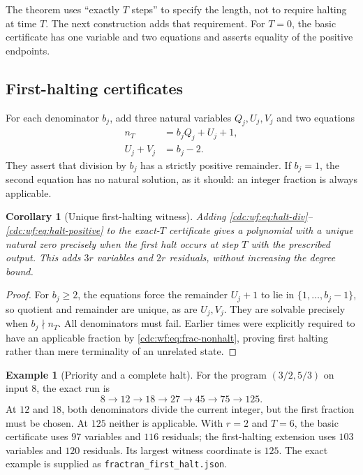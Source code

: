 \documentclass[11pt,a4paper]{article}
\newtheorem{corollary}[corollary]{Corollary}
\theoremstyle{definition}
\newtheorem{example}[example]{Example}
\theoremstyle{remark}
\begin{document}
The theorem uses ``exactly $T$ steps'' to specify the length, not to require halting at time $T$. The next construction adds that requirement. For $T=0$, the basic certificate has one variable and two equations and asserts equality of the positive endpoints.

\subsection{First-halting certificates}
For each denominator $b_j$, add three natural variables $Q_j,U_j,V_j$ and two equations
\begin{align}
 n_T&=b_jQ_j+U_j+1,\label{cdc:wf:eq:halt-div}\\
 U_j+V_j&=b_j-2.\label{cdc:wf:eq:halt-positive}
\end{align}
They assert that division by $b_j$ has a strictly positive remainder. If $b_j=1$, the second equation has no natural solution, as it should: an integer fraction is always applicable.

\begin{corollary}[Unique first-halting witness]\label{cdc:wf:cor:halt}
Adding \eqref{cdc:wf:eq:halt-div}--\eqref{cdc:wf:eq:halt-positive} to the exact-$T$ certificate gives a polynomial with a unique natural zero precisely when the first halt occurs at step $T$ with the prescribed output. This adds $3r$ variables and $2r$ residuals, without increasing the degree bound.
\end{corollary}
\begin{proof}
For $b_j\geq2$, the equations force the remainder $U_j+1$ to lie in $\{1,\ldots,b_j-1\}$, so quotient and remainder are unique, as are $U_j,V_j$. They are solvable precisely when $b_j\nmid n_T$. All denominators must fail. Earlier times were explicitly required to have an applicable fraction by \eqref{cdc:wf:eq:frac-nonhalt}, proving first halting rather than mere terminality of an unrelated state.
\end{proof}

\begin{example}[Priority and a complete halt]
For the program $(3/2,5/3)$ on input $8$, the exact run is
\[
 8\longrightarrow12\longrightarrow18\longrightarrow27
 \longrightarrow45\longrightarrow75\longrightarrow125.
\]
At $12$ and $18$, both denominators divide the current integer, but the first fraction must be chosen. At $125$ neither is applicable. With $r=2$ and $T=6$, the basic certificate uses $97$ variables and $116$ residuals; the first-halting extension uses $103$ variables and $120$ residuals. Its largest witness coordinate is $125$. The exact example is supplied as \texttt{fractran\_first\_halt.json}.
\end{example}
\end{document}
